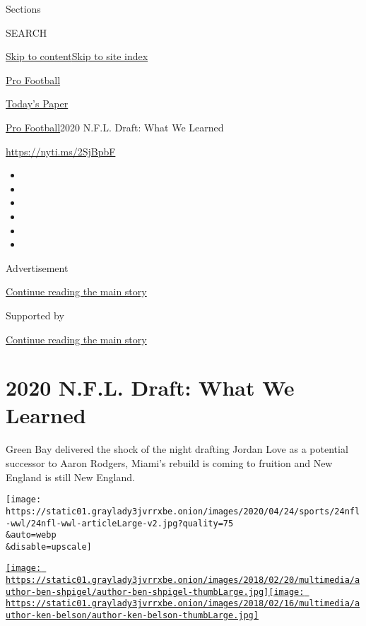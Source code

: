 Sections

SEARCH

\protect\hyperlink{site-content}{Skip to
content}\protect\hyperlink{site-index}{Skip to site index}

\href{https://www.nytimes3xbfgragh.onion/section/sports/football}{Pro
Football}

\href{https://myaccount.nytimes3xbfgragh.onion/auth/login?response_type=cookie\&client_id=vi}{}

\href{https://www.nytimes3xbfgragh.onion/section/todayspaper}{Today's
Paper}

\href{/section/sports/football}{Pro Football}\textbar{}2020 N.F.L.
Draft: What We Learned

\url{https://nyti.ms/2SjBpbF}

\begin{itemize}
\item
\item
\item
\item
\item
\item
\end{itemize}

Advertisement

\protect\hyperlink{after-top}{Continue reading the main story}

Supported by

\protect\hyperlink{after-sponsor}{Continue reading the main story}

\hypertarget{2020-nfl-draft-what-we-learned}{%
\section{2020 N.F.L. Draft: What We
Learned}\label{2020-nfl-draft-what-we-learned}}

Green Bay delivered the shock of the night drafting Jordan Love as a
potential successor to Aaron Rodgers, Miami's rebuild is coming to
fruition and New England is still New England.

\texttt{[image: https://static01.graylady3jvrrxbe.onion/images/2020/04/24/sports/24nfl-wwl/24nfl-wwl-articleLarge-v2.jpg?quality=75\\\&auto=webp\\\&disable=upscale]}

\href{https://www.nytimes3xbfgragh.onion/by/ben-shpigel}{\texttt{[image: https://static01.graylady3jvrrxbe.onion/images/2018/02/20/multimedia/author-ben-shpigel/author-ben-shpigel-thumbLarge.jpg]}}\href{https://www.nytimes3xbfgragh.onion/by/ken-belson}{\texttt{[image: https://static01.graylady3jvrrxbe.onion/images/2018/02/16/multimedia/author-ken-belson/author-ken-belson-thumbLarge.jpg]}}

